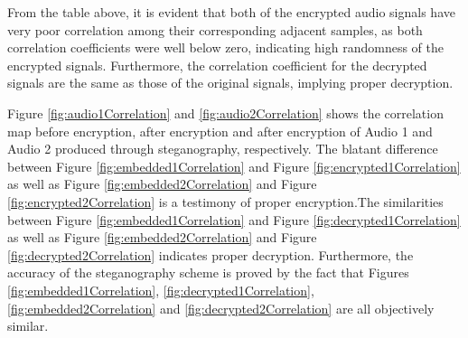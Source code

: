 \documentclass[a4paper]{cas-sc}
\begin{document}
From the table above, it is evident that both of the encrypted audio signals have very poor correlation among their corresponding adjacent samples, as both correlation coefficients were well below zero, indicating high randomness of the encrypted signals. Furthermore, the correlation coefficient for the decrypted signals are the same as those of the original signals, implying proper decryption.

Figure \ref{fig:audio1Correlation} and \ref{fig:audio2Correlation} shows the correlation map before encryption, after encryption and after encryption of Audio 1 and Audio 2 produced through steganography, respectively. The blatant difference between Figure \ref{fig:embedded1Correlation} and Figure \ref{fig:encrypted1Correlation} as well as Figure \ref{fig:embedded2Correlation} and Figure \ref{fig:encrypted2Correlation} is a testimony of proper encryption.The similarities between Figure \ref{fig:embedded1Correlation} and Figure \ref{fig:decrypted1Correlation} as well as Figure \ref{fig:embedded2Correlation} and Figure \ref{fig:decrypted2Correlation} indicates proper decryption. Furthermore, the accuracy of the steganography scheme is proved by the fact that Figures \ref{fig:embedded1Correlation}, \ref{fig:decrypted1Correlation}, \ref{fig:embedded2Correlation} and \ref{fig:decrypted2Correlation} are all objectively similar.
\end{document}

